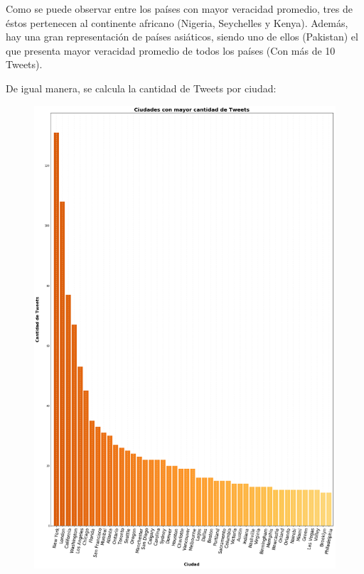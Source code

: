 \documentclass[titlepage,a4paper]{article}
\begin{document}
    Como se puede observar entre los países con mayor veracidad promedio, tres de éstos pertenecen al continente africano (Nigeria, Seychelles y Kenya). Además, hay una gran representación de países asiáticos, siendo uno de ellos (Pakistan) el que presenta mayor veracidad promedio de todos los países (Con más de 10 Tweets). 
    
    De igual manera, se calcula la cantidad de Tweets por ciudad:
    
    \begin{figure}[H]
    \centering
    \includegraphics[width=1\textwidth]{graficos/Analisis de Locacion/ciudades_con_mayor_cantidad_de_tweets.png}
    \caption{}
    \end{figure}
    
\end{document}
